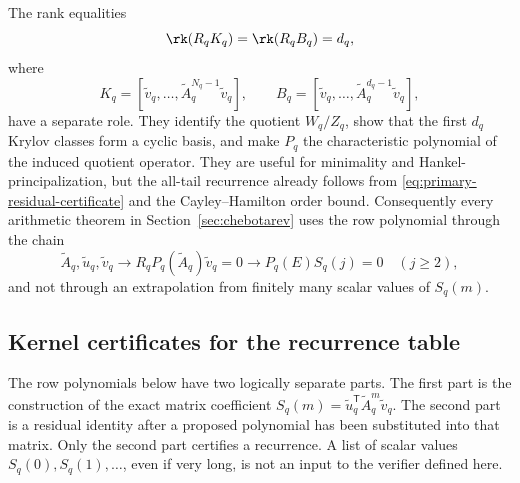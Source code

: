 The rank equalities
\[
  \rk(R_qK_q)=\rk(R_qB_q)=d_q,
\]
where
\[
  K_q=[\widetilde v_q,\dots,\widetilde A_q^{N_q-1}\widetilde v_q],
  \qquad
  B_q=[\widetilde v_q,\dots,\widetilde A_q^{d_q-1}\widetilde v_q],
\]
have a separate role.  They identify the quotient \(W_q/Z_q\), show that the
first \(d_q\) Krylov classes form a cyclic basis, and make \(P_q\) the
characteristic polynomial of the induced quotient operator.  They are useful for
minimality and Hankel-principalization, but the all-tail recurrence already
follows from \eqref{eq:primary-residual-certificate} and the
Cayley--Hamilton order bound.  Consequently every arithmetic theorem in
Section~\ref{sec:chebotarev} uses the row polynomial through the chain
\[
  \widetilde A_q,\widetilde u_q,\widetilde v_q
  \longrightarrow
  R_qP_q(\widetilde A_q)\widetilde v_q=0
  \longrightarrow
  P_q(E)S_q(j)=0\quad(j\ge2),
\]
and not through an extrapolation from finitely many scalar values of \(S_q(m)\).

\subsection{Kernel certificates for the recurrence table}

The row polynomials below have two logically separate parts.  The first part is
the construction of the exact matrix coefficient
\(S_q(m)=\widetilde u_q^{\mathsf T}\widetilde A_q^m\widetilde v_q\).  The second
part is a residual identity after a proposed polynomial has been substituted into
that matrix.  Only the second part certifies a recurrence.  A list of scalar
values \(S_q(0),S_q(1),\dots\), even if very long, is not an input to the
verifier defined here.


